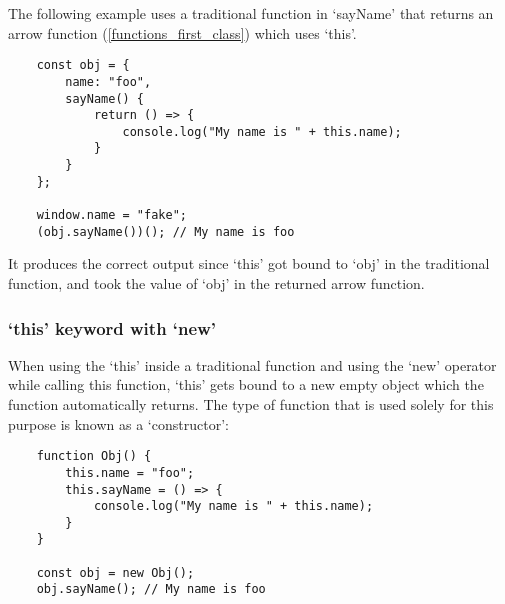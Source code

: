\documentclass[11pt,a4paper]{article}
\begin{document}
The following example uses a traditional function in `sayName' that
returns an arrow function (\ref{functions_first_class}) which uses `this'.
\begin{verbatim}
    const obj = {
        name: "foo",
        sayName() {
            return () => {
                console.log("My name is " + this.name);
            }
        }
    };

    window.name = "fake";
    (obj.sayName())(); // My name is foo
\end{verbatim}
It produces the correct output since `this' got bound to `obj' in the traditional function,
and took the value of `obj' in the returned arrow function.

\subsubsection{`this' keyword with `new'}
When using the `this' inside a traditional function and using the `new' operator while calling this function,
`this' gets bound to a new empty object which the function automatically returns.
The type of function that is used solely for this purpose is known as a `constructor':
\begin{verbatim}
    function Obj() {
        this.name = "foo";
        this.sayName = () => {
            console.log("My name is " + this.name);
        }
    }

    const obj = new Obj();
    obj.sayName(); // My name is foo
\end{verbatim}
\end{document}
